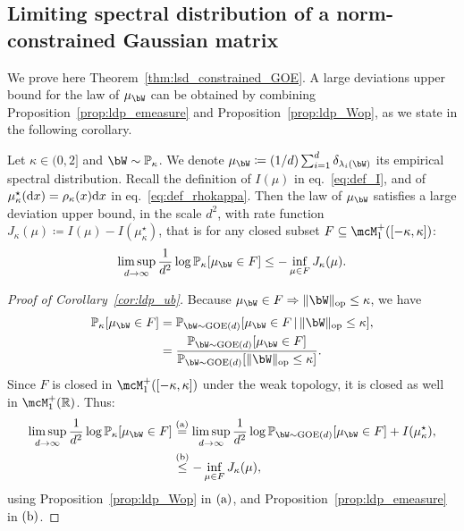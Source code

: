 \subsection{Limiting spectral distribution of a norm-constrained Gaussian matrix}\label{subsec:proof_lsd_constrained_GOE}

We prove here Theorem~\ref{thm:lsd_constrained_GOE}.
A large deviations upper bound for the law of $\mu_\bW$ can be obtained by combining Proposition~\ref{prop:ldp_emeasure} 
and Proposition~\ref{prop:ldp_Wop}, as we state in the following corollary.
\begin{corollary}
    \label{cor:ldp_ub}
    Let $\kappa \in (0,2]$ and $\bW \sim \bbP_\kappa$. 
    We denote $\mu_{\bW} \coloneqq (1/d) \sum_{i=1}^d \delta_{\lambda_i(\bW)}$ its empirical spectral distribution. 
    Recall the definition of $I(\mu)$ in eq.~\eqref{eq:def_I}, and of $\mu_\kappa^\star(\mathrm{d} x) =\rho_\kappa(x) \mathrm{d} x$ in eq.~\eqref{eq:def_rhokappa}.
    Then the law of $\mu_\bW$ satisfies a large deviation upper bound, in the scale $d^2$, with rate function 
    $J_\kappa(\mu) \coloneqq I(\mu) - I(\mu_\kappa^\star)$,
    that is for any closed subset $F \subseteq \mcM_1^+([-\kappa,\kappa])$: 
    \begin{align*}
            \limsup_{d\to\infty} \frac{1}{d^2} \log \bbP_\kappa[\mu_\bW \in F] \leq - \inf_{\mu \in F} J_\kappa(\mu).
    \end{align*}
\end{corollary}
\begin{proof}[Proof of Corollary~\ref{cor:ldp_ub}]
    Because $\mu_\bW \in F \Rightarrow \|\bW\|_\op \leq \kappa$, we have 
    \begin{align*}
       \bbP_\kappa[\mu_\bW \in F] &= \bbP_{\bW \sim \GOE(d)}[\mu_\bW \in F \, | \, \|\bW\|_\op \leq \kappa], \\
       &= \frac{\bbP_{\bW \sim \GOE(d)}[\mu_\bW \in F]}{\bbP_{\bW \sim \GOE(d)}[\|\bW\|_\op \leq \kappa]}.
    \end{align*}
    Since $F$ is closed in $\mcM_1^+([-\kappa,\kappa])$ under the weak topology, it is closed as well in $\mcM_1^+(\bbR)$.
    Thus:
    \begin{align*}
       \limsup_{d \to \infty} \frac{1}{d^2} \log \bbP_\kappa[\mu_\bW \in F] &\aeq \limsup_{d \to \infty} \frac{1}{d^2} \log \bbP_{\bW \sim \GOE(d)}[\mu_\bW \in F] + I(\mu_\kappa^\star), \\ 
       &\bleq - \inf_{\mu \in F} J_\kappa(\mu),
    \end{align*}
    using Proposition~\ref{prop:ldp_Wop} in $(\rm a)$, and Proposition~\ref{prop:ldp_emeasure} in $(\rm b)$.
\end{proof}
